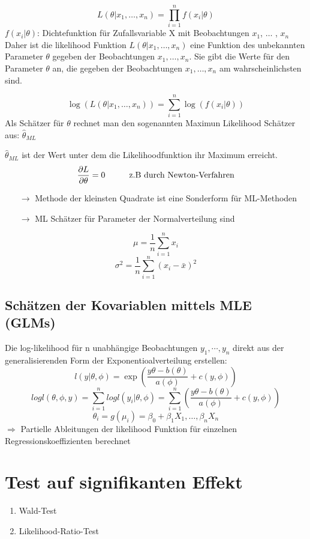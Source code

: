 \[
L(\theta|x_1, \ldots, x_n)  = \prod_{i=1}^{n} f(x_i|\theta)
\]
$f(x_i|\theta)$: Dichtefunktion für Zufallsvariable X mit Beobachtungen $x_1$, $\ldots$ , $x_n$\\

Daher ist die likelihood Funktion  $L(\theta|x_1, \ldots, x_n)$ eine Funktion des unbekannten Parameter $\theta$ gegeben der Beobachtungen $x_1, \ldots, x_n$. Sie gibt die Werte für den Parameter $\theta$ an, die gegeben der Beobachtungen $x_1,\ldots, x_n$ am wahrscheinlichsten sind.

\[
\log (L(\theta|x_1, \ldots, x_n))  = \sum_{i=1}^{n} \log(f(x_i|\theta))
\]
Als Schätzer für $\theta$ rechnet man den sogenannten Maximun Likelihood Schätzer aus: $\hat{\theta}_{ML}$

$\hat{\theta}_{ML}$ ist der Wert unter dem die Likelihoodfunktion ihr Maximum erreicht.
\[
\frac{\partial L}{\partial \theta} = 0 \text{\tab z.B durch Newton-Verfahren}
\]


\begin{itemize}
	\item[$\rightarrow$] Methode der kleinsten Quadrate ist eine Sonderform für ML-Methoden
	\item[$\rightarrow$] ML Schätzer für Parameter der Normalverteilung sind 
\end{itemize}


\[\mu = \frac{1}{n} \sum_{i = 1}^{n} x_i \]
\[\sigma^2 = \frac{1}{n} \sum_{i = 1}^{n}(x_i - \bar{x})^2\]

\subsection{Schätzen der Kovariablen mittels MLE (GLMs)}
Die log-likelihood für n unabhängige Beobachtungen $y_1,\cdots,y_n$ direkt aus der generalisierenden Form der Exponentioalverteilung erstellen:
\[ l(y|\theta, \phi) = \exp \left( \frac{y \theta - b(\theta)}{a(\phi)} + c(y,\phi) \right) \]
\[ log l (\theta, \phi, y) = \sum\limits_{i=1}^{n} log l (y_i | \theta, \phi) = \sum\limits_{i=1}^{n} \left( \frac{y \theta - b(\theta)}{a(\phi)} + c(y,\phi) \right) \]
\[\theta_i = g(\mu_i)=\beta_0 + \beta_1 X_1,\dots,\beta_n X_n \]
$\Rightarrow$ Partielle Ableitungen der likelihood Funktion für einzelnen Regressionskoeffizienten berechnet

\section{Test auf signifikanten Effekt}
\begin{enumerate}
	\item Wald-Test
	\item Likelihood-Ratio-Test
\end{enumerate}

